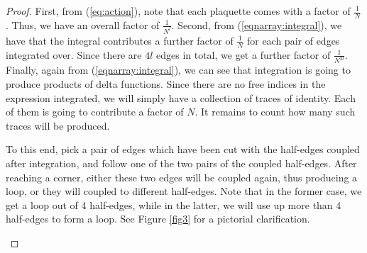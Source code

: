 \documentclass[twoside, a4paper,10pt]{article}
\begin{document}
\begin{proof}
First, from (\ref{eq:action}), note that each plaquette comes with a factor of $\frac{1}{N}$. Thus, we have an overall factor of $\frac{1}{N^l}$. Second, from (\ref{eqnarray:integral}), we have that the integral contributes a further factor of $\frac{1}{N}$ for each pair of edges integrated over. Since there are $4l$ edges in total, we get a further factor of $\frac{1}{N^{2l}}$. Finally, again from (\ref{eqnarray:integral}), we can see that integration is going to produce products of delta functions. Since there are no free indices in the expression integrated, we will simply have a collection of traces of identity. Each of them is going to contribute a factor of $N$. It remains to count how many such traces will be produced. \newline

To this end, pick a pair of edges which have been cut with the half-edges coupled after integration, and follow one of the two pairs of the coupled half-edges. After reaching a corner, either these two edges will be coupled again, thus producing a loop, or they will coupled to different half-edges. Note that in the former case, we get a loop out of 4 half-edges, while in the latter, we will use up more than 4 half-edges to form a loop. See Figure \ref{fig3} for a pictorial clarification. \newline


\begin{figure}[h]
\end{figure}
\end{proof}
\end{document}
